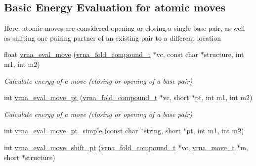 \subsection*{Basic Energy Evaluation for atomic moves}
\label{_amgrp61b9b8bfaa6416ab6be391e8557e0eb1}%
Here, atomic moves are considered opening or closing a single base pair, as well as shifting one pairing partner of an existing pair to a different location \begin{DoxyCompactItemize}
\item 
float \mbox{\hyperlink{group__eval_gaff1b9e4f4d17b434b0a822fe783672c1}{vrna\+\_\+eval\+\_\+move}} (\mbox{\hyperlink{group__fold__compound_ga1b0cef17fd40466cef5968eaeeff6166}{vrna\+\_\+fold\+\_\+compound\+\_\+t}} $\ast$vc, const char $\ast$structure, int m1, int m2)
\begin{DoxyCompactList}\small\item\em Calculate energy of a move (closing or opening of a base pair) \end{DoxyCompactList}\item 
int \mbox{\hyperlink{group__eval_ga123dabc119ea98c968a5e903cc46f0fb}{vrna\+\_\+eval\+\_\+move\+\_\+pt}} (\mbox{\hyperlink{group__fold__compound_ga1b0cef17fd40466cef5968eaeeff6166}{vrna\+\_\+fold\+\_\+compound\+\_\+t}} $\ast$vc, short $\ast$pt, int m1, int m2)
\begin{DoxyCompactList}\small\item\em Calculate energy of a move (closing or opening of a base pair) \end{DoxyCompactList}\item 
int \mbox{\hyperlink{group__eval_ga8bd14b548874366b8a2a9c65eff08888}{vrna\+\_\+eval\+\_\+move\+\_\+pt\+\_\+simple}} (const char $\ast$string, short $\ast$pt, int m1, int m2)
\item 
int \mbox{\hyperlink{group__eval_gad8b0299608b6dd9f6e5554e939cdbbec}{vrna\+\_\+eval\+\_\+move\+\_\+shift\+\_\+pt}} (\mbox{\hyperlink{group__fold__compound_ga1b0cef17fd40466cef5968eaeeff6166}{vrna\+\_\+fold\+\_\+compound\+\_\+t}} $\ast$vc, \mbox{\hyperlink{group__neighbors_ga08630e00206cd163ea29c462bf5f4755}{vrna\+\_\+move\+\_\+t}} $\ast$m, short $\ast$structure)
\end{DoxyCompactItemize}
